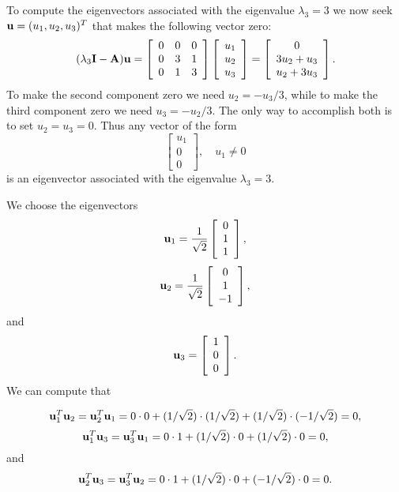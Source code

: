 \begin{solution}
\begin{enumerate}
To compute the eigenvectors associated with the eigenvalue $\lambda_3=3$ we now seek ${\bf u} = (u_1, u_2, u_3)^T$ that makes the following vector zero:
\[ (\lambda_3 {\bf I}-{\bf A}) {\bf u} = \left[\begin{array}{ccc}0& 0 & 0 \\ 0 & 3 & 1 \\ 0 & 1 & 3\end{array}\right]
                             \left[\begin{array}{c}u_1 \\ u_2\\ u_3\end{array}\right]
                           = \left[\begin{array}{c}0 \\ 3u_2+u_3 \\ u_2+3u_3\end{array}\right].\]
To make the second component zero we need $u_2 = -u_3/3$, while to make
the third component zero we need $u_3 = -u_2/3$.  The only way to accomplish
both is to set $u_2=u_3=0$.  Thus any vector of the form
\[ \left[\begin{array}{c}u_1 \\ 0 \\ 0\end{array}\right], \quad u_1 \ne 0\]
is an eigenvector associated with the eigenvalue $\lambda_3=3$.

We choose the eigenvectors
\[ {\bf u}_1 = {1\over \sqrt{2}} \left[\begin{array}{c}0 \\ 1 \\ 1\end{array}\right],\]
\[ {\bf u}_2 = {1\over \sqrt{2}} \left[\begin{array}{c}0 \\ 1 \\ -1\end{array}\right],\]
and
\[ {\bf u}_3 = \left[\begin{array}{c}1 \\ 0 \\ 0\end{array}\right].\]
We can compute that

      \[ {\bf u}_1^T {\bf u}_2 = {\bf u}_2^T{\bf u}_1 = 0\cdot0 + (1/\sqrt{2})\cdot (1/\sqrt{2}) + (1/\sqrt{2})\cdot (-1/\sqrt{2}) = 0,\]
      \[ {\bf u}_1^T {\bf u}_3 = {\bf u}_3^T{\bf u}_1 = 0\cdot1 + (1/\sqrt{2})\cdot 0 + (1/\sqrt{2})\cdot 0 = 0,\]
and
      \[ {\bf u}_2^T {\bf u}_3 = {\bf u}_3^T{\bf u}_2 = 0\cdot1 + (1/\sqrt{2})\cdot 0 + (-1/\sqrt{2})\cdot 0 = 0.\]


\end{enumerate}
\end{solution}
